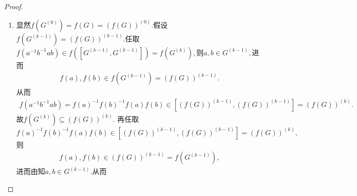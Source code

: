 \documentclass[../../main.tex]{subfiles}%
\begin{document}
\begin{proof}
\begin{enumerate}[(1)]
由条件知$\Gamma _1\left( A \right) =A\subseteq B=\Gamma _1\left( B \right)$。假设$\Gamma _{k-1}\left( A \right) \subseteq \Gamma _{k-1}\left( B \right)$，则由知
\begin{align*}
\Gamma _k\left( A \right) =\left[ A,\Gamma _{k-1}\left( A \right) \right] \subseteq \left[ B,\Gamma _{k-1}\left( B \right) \right] =\Gamma _k\left( B \right).
\end{align*}
故由数学归纳法知
\begin{align*}
\Gamma _k\left( A \right) \subseteq \Gamma _k\left( B \right),\quad \forall k\in \mathbb{N}.
\end{align*}

\item 显然$f\left( G^{\left( 0 \right)} \right) =f\left( G \right) =\left( f\left( G \right) \right) ^{\left( 0 \right)}.$假设$f\left( G^{\left( k-1 \right)} \right) = \left( f\left( G \right) \right) ^{\left( k-1 \right)}.$任取$f\left( a^{-1}b^{-1}ab \right) \in f\left( \left[ G^{\left( k-1 \right)},G^{\left( k-1 \right)} \right] \right) =f\left( G^{\left( k \right)} \right) ,$则$a,b\in G^{\left( k-1 \right)},$进而
\begin{align*}
f\left( a \right) ,f\left( b \right) \in f\left( G^{\left( k-1 \right)} \right) = \left( f\left( G \right) \right) ^{\left( k-1 \right)}.
\end{align*}
从而
\begin{align*}
f\left( a^{-1}b^{-1}ab \right) =f\left( a \right) ^{-1}f\left( b \right) ^{-1}f\left( a \right) f\left( b \right) \in \left[ \left( f\left( G \right) \right) ^{\left( k-1 \right)},\left( f\left( G \right) \right) ^{\left( k-1 \right)} \right] =\left( f\left( G \right) \right) ^{\left( k \right)}.
\end{align*}
故$f\left( G^{\left( k \right)} \right) \subseteq \left( f\left( G \right) \right) ^{\left( k \right)}.$
再任取$f\left( a \right) ^{-1}f\left( b \right) ^{-1}f\left( a \right) f\left( b \right) \in \left[ \left( f\left( G \right) \right) ^{\left( k-1 \right)},\left( f\left( G \right) \right) ^{\left( k-1 \right)} \right] =\left( f\left( G \right) \right) ^{\left( k \right)},$则
\begin{align*}
f\left( a \right) ,f\left( b \right) \in \left( f\left( G \right) \right) ^{\left( k-1 \right)}= f\left( G^{\left( k-1 \right)} \right) ,
\end{align*}
进而由知$a,b\in G^{\left( k-1 \right)}.$从而

\end{enumerate}
\end{proof}
\end{document}
